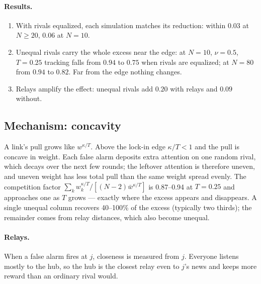 
\begin{table}[tbp]\centering\small
\caption{The A4 test at $T=0.25$. ``Equal'': rivals equalized every round. ``Competition'': total rival pull relative to
equal rivals in the evidence column walk.}\label{tab:a4}
\resizebox{\linewidth}{!}{}
\end{table}

\paragraph{Results.}
\begin{enumerate}
  \item With rivals equalized, each simulation matches its reduction: within 0.03 at $N\ge20$, 0.06 at $N=10$.
  \item Unequal rivals carry the whole excess near the edge: at $N=10$, $\nu=0.5$, $T=0.25$ tracking falls from $0.94$ to
    $0.75$ when rivals are equalized; at $N=80$ from $0.94$ to $0.82$. Far from the edge nothing changes.
  \item Relays amplify the effect: unequal rivals add $0.20$ with relays and $0.09$ without.
\end{enumerate}

\subsection{Mechanism: concavity}
A link's pull grows like $w^{\kappa/T}$. Above the lock-in edge $\kappa/T<1$ and the pull is concave in weight. Each false
alarm deposits extra attention on one random rival, which decays over the next few rounds; the leftover attention is
therefore uneven, and uneven weight has less total pull than the same weight spread evenly. The competition factor
$\sum_k w_k^{\kappa/T}/[(N-2)\bar w^{\kappa/T}]$ is 0.87--0.94 at $T=0.25$ and approaches one as $T$ grows --- exactly
where the excess appears and disappears. A single unequal column recovers 40--100\% of the excess (typically two
thirds); the remainder comes from relay distances, which also become unequal.

\paragraph{Relays.} When a false alarm fires at $j$, closeness is measured from $j$. Everyone listens mostly to the hub,
so the hub is the closest relay even to $j$'s news and keeps more reward than an ordinary rival would.


